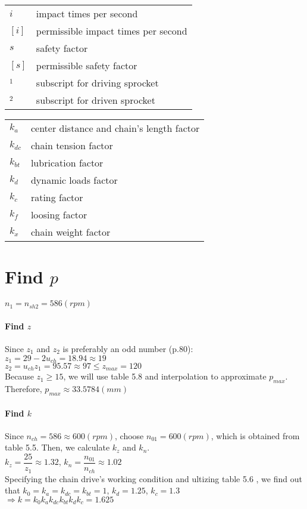 \begin{tabular}[t]{lp{7cm}}
	$ i $ & impact times per second\\
	$ [i] $ & permissible impact times per second\\
	$ s $ & safety factor\\
	$ [s] $ & permissible safety factor\\
	$ _1 $  & subscript for driving sprocket\\
	$ _2 $  & subscript for driven sprocket
\end{tabular}
\begin{tabular}[t]{lp{7cm}}
	$ k_a $ & center distance and chain's length factor\\
	$ k_{dc} $ & chain tension  factor\\
	$ k_{bt} $ & lubrication factor\\
	$ k_d $ & dynamic loads factor\\
	$ k_c $ & rating factor\\
	$ k_f $ & loosing factor\\
	$ k_x $ & chain weight factor\\
\end{tabular}

\section{Find $ p $}
$ n_1 = n_{sh2} = 586\unit{(rpm)} $

\paragraph{Find $ z $}
Since $ z_1 $ and $ z_2 $ is preferably an odd number (p.80):\\
$ z_1 = 29 - 2u_{ch} = 18.94 \approx 19$\\
$ z_2 = u_{ch}z_1 = 95.57 \approx 97 \leq z_{max} = 120$\\
Because $ z_1 \geq 15 $, we will use table 5.8 and interpolation to approximate $ p_{max} $. Therefore, $ p_{max} \approx 33.5784 \unit{(mm)} $

\paragraph{Find $ k $}
Since $ n_{ch} = 586 \approx 600 \unit{(rpm)}$, choose $ n_{01} = 600\unit{(rpm)} $, which is obtained from table 5.5. Then, we calculate $ k_z $ and $ k_n $.\\
$ k_z = \dfrac{25}{z_1} \approx 1.32$, 
$ k_n = \dfrac{n_{01}}{n_{ch}} \approx 1.02$\\
Specifying the chain drive's working condition and ultizing table 5.6 , we find out that $ k_0=k_a=k_{dc}=k_{bt}=1 $, $ k_d=1.25 $, $ k_c=1.3 $\\
$\Rightarrow k = k_0k_ak_{dc}k_{bt}k_dk_c = 1.625$

